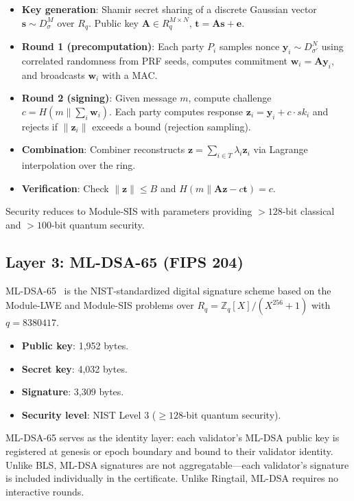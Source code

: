 \begin{itemize}[leftmargin=2em]
\item \textbf{Key generation}: Shamir secret sharing of a discrete Gaussian
      vector $\mathbf{s} \sim D_{\sigma}^{M}$ over $R_q$. Public key
      $\mathbf{A} \in R_q^{M \times N}$, $\mathbf{t} = \mathbf{A}\mathbf{s}
      + \mathbf{e}$.
\item \textbf{Round 1 (precomputation)}: Each party $P_i$ samples nonce
      $\mathbf{y}_i \sim D_{\sigma'}^N$ using correlated randomness from PRF
      seeds, computes commitment $\mathbf{w}_i = \mathbf{A}\mathbf{y}_i$, and
      broadcasts $\mathbf{w}_i$ with a MAC.
\item \textbf{Round 2 (signing)}: Given message $m$, compute challenge
      $c = H(m \mathbin\| \sum_i \mathbf{w}_i)$. Each party computes response
      $\mathbf{z}_i = \mathbf{y}_i + c \cdot \mathit{sk}_i$ and rejects if
      $\|\mathbf{z}_i\|$ exceeds a bound (rejection sampling).
\item \textbf{Combination}: Combiner reconstructs $\mathbf{z} = \sum_{i \in T}
      \lambda_i \mathbf{z}_i$ via Lagrange interpolation over the ring.
\item \textbf{Verification}: Check $\|\mathbf{z}\| \leq B$ and
      $H(m \mathbin\| \mathbf{A}\mathbf{z} - c\mathbf{t}) = c$.
\end{itemize}

Security reduces to Module-SIS with parameters providing $> 128$-bit classical
and $> 100$-bit quantum security.

\subsection{Layer 3: ML-DSA-65 (FIPS 204)}

ML-DSA-65~\cite{nist-pqc} is the NIST-standardized digital signature scheme
based on the Module-LWE and Module-SIS problems over
$R_q = \mathbb{Z}_q[X]/(X^{256}+1)$ with $q = 8380417$.

\begin{itemize}[leftmargin=2em]
\item \textbf{Public key}: 1{,}952 bytes.
\item \textbf{Secret key}: 4{,}032 bytes.
\item \textbf{Signature}: 3{,}309 bytes.
\item \textbf{Security level}: NIST Level 3 ($\geq 128$-bit quantum security).
\end{itemize}

ML-DSA-65 serves as the identity layer: each validator's ML-DSA public key is
registered at genesis or epoch boundary and bound to their validator identity.
Unlike BLS, ML-DSA signatures are not aggregatable---each validator's signature
is included individually in the certificate. Unlike Ringtail, ML-DSA requires
no interactive rounds.


